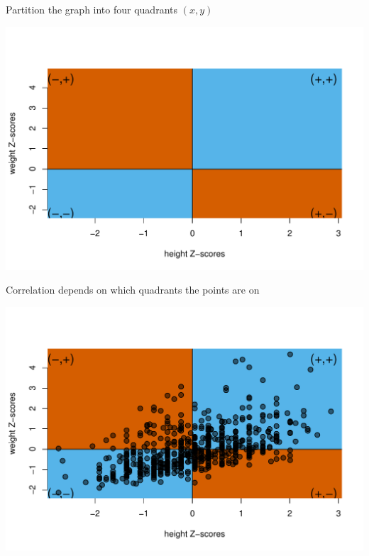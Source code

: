 \documentclass[10pt,handout]{beamer}\usepackage[]{graphicx}\usepackage[]{color}
\makeatletter
\def\maxwidth{ %
  \ifdim\Gin@nat@width>\linewidth
    \linewidth
  \else
    \Gin@nat@width
  \fi
}
\newenvironment{knitrout}{}{} %
\makeatother
\begin{document}
\begin{frame}[fragile]{Partition the graph into four quadrants $(x,y)$}
	
\begin{knitrout}\tiny
{}\color{fgcolor}

{\centering \includegraphics[width=\maxwidth]{figure/unnamed-chunk-1-1} 

}


\end{knitrout}
	
\end{frame}


\begin{frame}[fragile]{Correlation depends on which quadrants the points are on}
	
\begin{knitrout}\tiny
{}\color{fgcolor}

{\centering \includegraphics[width=\maxwidth]{figure/unnamed-chunk-2-1} 

}


\end{knitrout}
	
\end{frame}
\end{document}
